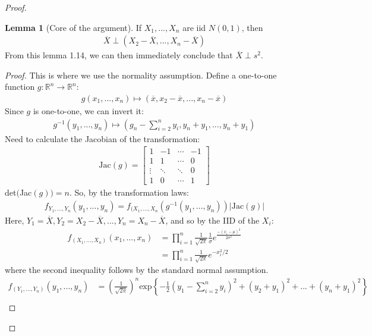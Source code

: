\documentclass[11pt]{scrartcl}
\newcommand{\R}[0]{\mathbb{R}}
\theoremstyle{definition}
\newtheorem{lemma}[theorem]{Lemma}
\theoremstyle{remark}
\begin{document}
{\begin{proof}
	\begin{lemma}[Core of the argument] If $X_1, ..., X_n$ are iid $N(0,1)$, then
	\begin{align}
		\overline{X} \perp (X_2 - \overline{X}, ..., X_n - \overline{X}) 
	\end{align}
	From this lemma 1.14, we can then immediately conclude that $\overline{X} \perp s^2$. 
	\end{lemma}
	\begin{proof} This is where we use the normality assumption. Define a one-to-one function $g: \R^n \rightarrow \R^n$: 
	\begin{align*}
		g(x_1, ..., x_n ) \mapsto (\overline{x}, x_2 - \overline{x}, ..., x_n - \overline{x})	
	\end{align*}
	Since $g$ is one-to-one, we can invert it: 
	\begin{align*}
	g^{-1}(y_1, ..., y_n) \mapsto \left(g_n - \sum_{i=2}^n y_i, y_n + y_1, ..., y_n + y_1  \right) 	
	\end{align*}
	Need to calculate the Jacobian  of the transformation: 
	\begin{align*}
		\text{Jac}(g) = \begin{bmatrix}
			1 & -1 & \cdots & -1 \\
			1 & 1  & \cdots & 0 \\
			\vdots & \ddots & \ddots & 0 \\
			1 & 0 & \cdots & 1 
		\end{bmatrix}	
	\end{align*}
	det$($Jac$(g)) = n$. So, by the transformation laws: 
	\begin{align*}
		f_{Y_1, ..., Y_n} (y_1 , ..., y_n) 	= f_{(X_1, ..., X_n} (g^{-1}(y_1, ..., y_n ) ) |\text{Jac}(g)|
	\end{align*}
	Here, $Y_1 = \overline{X}, Y_2= X_2 - \overline{X}, ..., Y_n  = X_n - \overline{X}$, and so by the IID of the $X_i$: 
	\begin{align*}
		f_{(X_1, ..., X_n)} (x_1, ..., x_n) & = \prod_{i=1}^n \frac{1}{\sqrt{2 \pi}}	 \frac{1}{\sigma} e^{\frac{-(x_i - \mu)^2}{2 \sigma^2}} \\	
		& = \prod_{i=1}^n \frac{1}{\sqrt{ 2 \pi}} e^{-x_i^2 / 2 } 		
	\end{align*}
	where the second inequality follows by the standard normal assumption. 
	\begin{align*}
		f_{(Y_1, ..., Y_n)}	(y_1, ..., y_n) & = \left( \frac{1}{\sqrt{2 \pi}}		\right)^n \text{exp} \left\{ 	-\frac{1}{2} \left(y_1 - \sum_{i=2}^n y_i \right)^2 + \left	( y_2 + y_1\right)^2 + ... + (y_n + y_1)^2 	\right\}  \\

\end{align*}
\end{proof}
\end{proof}}
\end{document}
